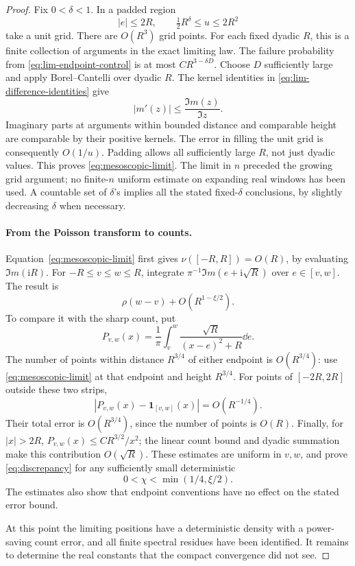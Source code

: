 \begin{proof}
Fix \(0<\delta<1\). In a padded region
\[
 |e|\le 2R,\qquad \tfrac12 R^\delta\le u\le 2R^2
\]
take a unit grid. There are \(O(R^3)\) grid points. For each fixed
dyadic \(R\), this is a finite collection of arguments in the exact
limiting law. The failure probability from
\eqref{eq:lim-endpoint-control} is at most
\(C R^{3-\delta D}\). Choose \(D\) sufficiently large and apply
Borel--Cantelli over dyadic \(R\).
The kernel identities in \eqref{eq:lim-difference-identities} give
\[
 |m'(z)|\le \frac{\Im m(z)}{\Im z}.
\]
Imaginary parts at arguments within bounded distance and comparable
height are comparable by their positive kernels. The error in
filling the unit grid is consequently \(O(1/u)\). Padding allows
all sufficiently large \(R\), not just dyadic values. This proves
\eqref{eq:mesoscopic-limit}. The limit in \(n\) preceded the growing
grid argument; no finite-\(n\) uniform estimate on expanding real
windows has been used. A countable set of \(\delta\)'s implies all
the stated fixed-\(\delta\) conclusions, by slightly decreasing
\(\delta\) when necessary.

\paragraph{From the Poisson transform to counts.}
Equation~\eqref{eq:mesoscopic-limit} first gives
\(\nu([-R,R])=O(R)\), by evaluating \(\Im m(\mathrm i R)\).
For \(-R\le v\le w\le R\), integrate
\(\pi^{-1}\Im m(e+\mathrm i\sqrt R)\) over \(e\in[v,w]\).
The result is
\[
 \rho(w-v)+O(R^{1-\xi/2}).
\]
To compare it with the sharp count, put
\[
 P_{v,w}(x)=\frac1\pi
   \int_v^w\frac{\sqrt R}{(x-e)^2+R}\dd e.
\]
The number of points within distance \(R^{3/4}\) of either
endpoint is \(O(R^{3/4})\): use
\eqref{eq:mesoscopic-limit} at that endpoint and height
\(R^{3/4}\). For points of \([-2R,2R]\) outside these two strips,
\[
 |P_{v,w}(x)-\boldsymbol 1_{[v,w]}(x)|=O(R^{-1/4}).
\]
Their total error is \(O(R^{3/4})\), since the number of points is
\(O(R)\). Finally, for \(|x|>2R\),
\(P_{v,w}(x)\le C R^{3/2}/x^2\); the linear count bound and dyadic
summation make this contribution \(O(\sqrt R)\).
These estimates are uniform in \(v,w\), and prove
\eqref{eq:discrepancy} for any sufficiently small deterministic
\[
 0<\chi<\min(1/4,\xi/2).
\]
The estimates also show that endpoint conventions have no effect
on the stated error bound.

At this point the limiting positions have a deterministic density
with a power-saving count error, and all finite spectral residues
have been identified. It remains to determine the real constants
that the compact convergence did not see.


\end{proof}
